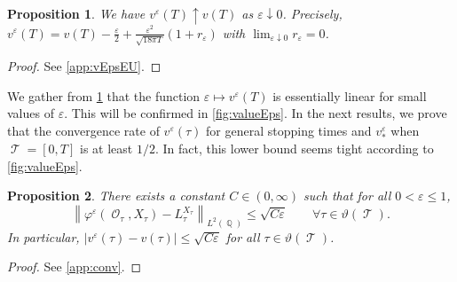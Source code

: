 \documentclass[11pt]{article}
\theoremstyle{plain}
\newtheorem{proposition}{Proposition}
\theoremstyle{definition}
\DeclareMathOperator{\E}{\mathbb{E}}
\DeclareMathOperator{\Q}{\mathbb{Q}}
\DeclareMathOperator{\calO}{\mathcal{O}}
\DeclareMathOperator{\calT}{\mathcal{T}}
\newcommand{\bb}[1]{\textcolor{blue}{#1}}
\def\avintin{\mathop{\,\, \rlap{--}\hspace{-1.05mm} \int \hspace{-1.2mm}}\nolimits} %
\begin{document}
\begin{proposition}\label{prop:vEpsEU}
    We have 
    $v^{\varepsilon}(T) \uparrow v(T)$ as  $\varepsilon \downarrow 0$. 
Precisely, $v^{\varepsilon}(T) = v(T) - \frac{\varepsilon}{2} + \frac{\varepsilon^2}{\sqrt{18\pi T}} (1 +  r_\varepsilon)$ with  $\lim_{\varepsilon\downarrow 0} r_\varepsilon = 0$.
\end{proposition}

\begin{proof}
    See \cref{app:vEpsEU}. 
\end{proof}

We gather from \cref{prop:vEpsEU} that the function $\varepsilon \mapsto v^{\varepsilon}(T)$ is essentially linear for small values of $\varepsilon$. This will be confirmed in \cref{fig:valueEps}. %
In the next results, we prove  that the convergence rate of  $v^{\varepsilon}(\tau)$ for general stopping times and  %
$v_{*}^{\varepsilon}$
when $\calT = [0,T]$ is at least  $1/2$. In fact, this lower bound  seems  tight according to   \cref{fig:valueEps}.   

\begin{proposition}\label{prop:conv}
There exists a constant $C\in (0,\infty)$ such that for all $0< \varepsilon \le 1$, 
\begin{equation}
    \left\lVert\varphi^{\varepsilon}(\calO_{\tau},X_{\tau}) - L_{\tau}^{X_{\tau}} \right\rVert_{L^2(\Q)} \le \sqrt{C\varepsilon}\qquad \forall \tau\in \vartheta(\calT).
\end{equation}
In particular, $ |v^{\varepsilon}(\tau) -  v(\tau)| \le \sqrt{C\varepsilon}$ for all  $\tau\in \vartheta(\calT)$. 
\end{proposition}
\begin{proof}
    See \cref{app:conv}. 
\end{proof}
\end{document}
